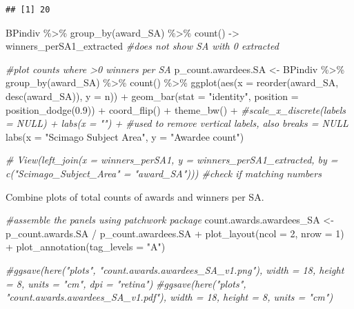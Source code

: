 \documentclass[
]{article}
\newenvironment{Shaded}{\begin{snugshade}}{\end{snugshade}}
\newcommand{\AttributeTok}[1]{\textcolor[rgb]{0.77,0.63,0.00}{#1}}
\newcommand{\CommentTok}[1]{\textcolor[rgb]{0.56,0.35,0.01}{\textit{#1}}}
\newcommand{\DecValTok}[1]{\textcolor[rgb]{0.00,0.00,0.81}{#1}}
\newcommand{\FloatTok}[1]{\textcolor[rgb]{0.00,0.00,0.81}{#1}}
\newcommand{\FunctionTok}[1]{\textcolor[rgb]{0.00,0.00,0.00}{#1}}
\newcommand{\NormalTok}[1]{#1}
\newcommand{\OtherTok}[1]{\textcolor[rgb]{0.56,0.35,0.01}{#1}}
\newcommand{\SpecialCharTok}[1]{\textcolor[rgb]{0.00,0.00,0.00}{#1}}
\newcommand{\StringTok}[1]{\textcolor[rgb]{0.31,0.60,0.02}{#1}}
\begin{document}
\begin{verbatim}
## [1] 20
\end{verbatim}

\begin{Shaded}
\begin{Highlighting}[]
\NormalTok{BPindiv }\SpecialCharTok{\%\textgreater{}\%}
  \FunctionTok{group\_by}\NormalTok{(award\_SA) }\SpecialCharTok{\%\textgreater{}\%} \FunctionTok{count}\NormalTok{() }\OtherTok{{-}\textgreater{}}\NormalTok{ winners\_perSA1\_extracted }\CommentTok{\#does not show SA with 0 extracted}

\CommentTok{\#plot counts where \textgreater{}0 winners per SA}
\NormalTok{p\_count.awardees.SA }\OtherTok{\textless{}{-}}\NormalTok{ BPindiv }\SpecialCharTok{\%\textgreater{}\%} 
  \FunctionTok{group\_by}\NormalTok{(award\_SA) }\SpecialCharTok{\%\textgreater{}\%} \FunctionTok{count}\NormalTok{() }\SpecialCharTok{\%\textgreater{}\%}
  \FunctionTok{ggplot}\NormalTok{(}\FunctionTok{aes}\NormalTok{(}\AttributeTok{x =} \FunctionTok{reorder}\NormalTok{(award\_SA, }\FunctionTok{desc}\NormalTok{(award\_SA)), }\AttributeTok{y =}\NormalTok{ n)) }\SpecialCharTok{+}
  \FunctionTok{geom\_bar}\NormalTok{(}\AttributeTok{stat =} \StringTok{"identity"}\NormalTok{, }\AttributeTok{position =} \FunctionTok{position\_dodge}\NormalTok{(}\FloatTok{0.9}\NormalTok{)) }\SpecialCharTok{+}
  \FunctionTok{coord\_flip}\NormalTok{() }\SpecialCharTok{+}
  \FunctionTok{theme\_bw}\NormalTok{() }\SpecialCharTok{+}
  \CommentTok{\#scale\_x\_discrete(labels = NULL) + labs(x = "")  + \#used to remove vertical labels, also breaks = NULL}
  \FunctionTok{labs}\NormalTok{(}\AttributeTok{x =} \StringTok{"Scimago Subject Area"}\NormalTok{, }\AttributeTok{y =} \StringTok{"Awardee count"}\NormalTok{)  }

\CommentTok{\# View(left\_join(x = winners\_perSA1, y = winners\_perSA1\_extracted, by = c("Scimago\_Subject\_Area" = "award\_SA"))) \#check if matching numbers}
\end{Highlighting}
\end{Shaded}

Combine plots of total counts of awards and winners per SA.

\begin{Shaded}
\begin{Highlighting}[]
\CommentTok{\#assemble the panels using patchwork package}
\NormalTok{count.awards.awardees\_SA }\OtherTok{\textless{}{-}}\NormalTok{ p\_count.awards.SA }\SpecialCharTok{/}\NormalTok{ p\_count.awardees.SA }\SpecialCharTok{+} 
  \FunctionTok{plot\_layout}\NormalTok{(}\AttributeTok{ncol =} \DecValTok{2}\NormalTok{, }\AttributeTok{nrow =} \DecValTok{1}\NormalTok{) }\SpecialCharTok{+}
  \FunctionTok{plot\_annotation}\NormalTok{(}\AttributeTok{tag\_levels =} \StringTok{"A"}\NormalTok{)}

\CommentTok{\#ggsave(here("plots", "count.awards.awardees\_SA\_v1.png"), width = 18, height = 8, units = "cm", dpi = "retina")}
\CommentTok{\#ggsave(here("plots", "count.awards.awardees\_SA\_v1.pdf"), width = 18, height = 8, units = "cm")}
\end{Highlighting}
\end{Shaded}
\end{document}
